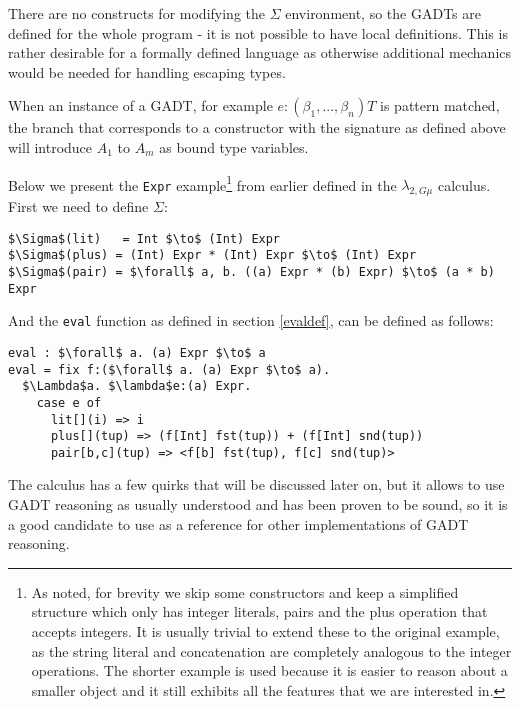 There are no constructs for modifying the $\Sigma$ environment, so the GADTs are defined for the whole program - it is not possible to have local definitions. This is rather desirable for a formally defined language as otherwise additional mechanics would be needed for handling escaping types.

When an instance of a GADT, for example $e: (\beta_1, ..., \beta_n) T$ is pattern matched, the branch that corresponds to a constructor with the signature as defined above will introduce $A_1$ to $A_m$ as bound type variables. %

Below we present the \texttt{Expr} example\footnote{As noted, for brevity we skip some constructors and keep a simplified structure which only has integer literals, pairs and the plus operation that accepts integers. It is usually trivial to extend these to the original example, as the string literal and concatenation are completely analogous to the integer operations. The shorter example is used because it is easier to reason about a smaller object and it still exhibits all the features that we are interested in.} from earlier defined in the $\lambda_{2,G\mu}$ calculus. First we need to define $\Sigma$:

\begin{lstlisting}[mathescape=true, basicstyle=\ttfamily]
$\Sigma$(lit)   = Int $\to$ (Int) Expr
$\Sigma$(plus) = (Int) Expr * (Int) Expr $\to$ (Int) Expr
$\Sigma$(pair) = $\forall$ a, b. ((a) Expr * (b) Expr) $\to$ (a * b) Expr
\end{lstlisting}

And the \texttt{eval} function as defined in section \ref{evaldef}, can be defined as follows:

\begin{lstlisting}[mathescape=true, basicstyle=\ttfamily]
eval : $\forall$ a. (a) Expr $\to$ a
eval = fix f:($\forall$ a. (a) Expr $\to$ a).
  $\Lambda$a. $\lambda$e:(a) Expr.
    case e of
      lit[](i) => i
      plus[](tup) => (f[Int] fst(tup)) + (f[Int] snd(tup))
      pair[b,c](tup) => <f[b] fst(tup), f[c] snd(tup)>
\end{lstlisting}

The calculus has a few quirks that will be discussed later on, but it allows to use GADT reasoning as usually understood and has been proven to be sound, so it is a good candidate to use as a reference for other implementations of GADT reasoning.

